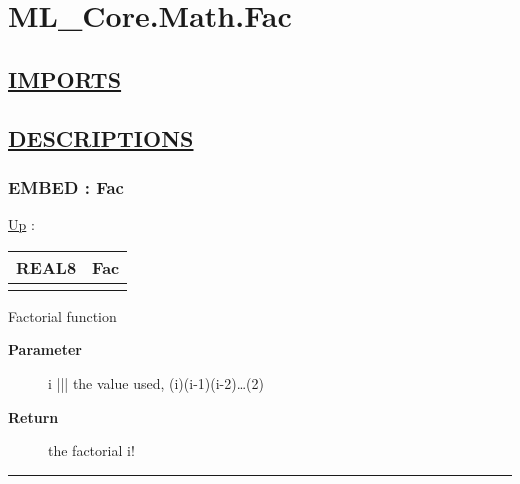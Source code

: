 \chapter*{ML\_Core.Math.Fac}
\hypertarget{ecldoc:toc:ML_Core.Math.Fac}{}

\section*{\underline{IMPORTS}}

\section*{\underline{DESCRIPTIONS}}
\subsection*{EMBED : Fac}
\hypertarget{ecldoc:ml_core.math.fac}{}
\hyperlink{ecldoc:toc:ML_Core/Math}{Up} :

{\renewcommand{\arraystretch}{1.5}
\begin{tabularx}{\textwidth}{|>{\raggedright\arraybackslash}l|X|}
\hline
\hspace{0pt}REAL8 & Fac \\
\hline
\multicolumn{2}{|>{\raggedright\arraybackslash}X|}{\hspace{0pt}(UNSIGNED2 i)} \\
\hline
\end{tabularx}
}

\par
Factorial function

\par
\begin{description}
\item [\textbf{Parameter}] i ||| the value used, (i)(i-1)(i-2)\ldots(2)
\item [\textbf{Return}] the factorial i!
\end{description}

\rule{\linewidth}{0.5pt}
